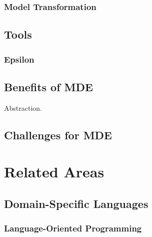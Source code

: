 \subsubsection{Model Transformation}
\label{subsubsec:model_transformation}

\subsection{Tools}

\subsubsection{Epsilon}
\label{subsubsec:epsilon}



\subsection{Benefits of MDE}
\label{subsec:mde_benefits}
Abstraction.

\subsection{Challenges for MDE}


\section{Related Areas}

\subsection{Domain-Specific Languages}
\label{subsec:dsls}

\subsubsection{Language-Oriented Programming}

